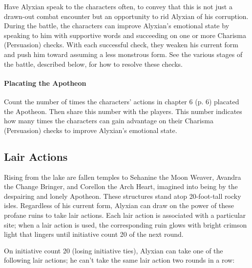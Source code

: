 \documentclass[letterpaper, 11pt, bg=full, twocolumn]{dndbook}
\begin{document}
Have Alyxian speak to the characters often, to convey that this is not just a drawn-out combat encounter but an opportunity to rid Alyxian of his corruption. During the battle, the characters can improve Alyxian's emotional state by speaking to him with supportive words and succeeding on one or more Charisma (Persuasion) checks. With each successful check, they weaken his current form and push him toward assuming a less monstrous form. See the various stages of the battle, described below, for how to resolve these checks.

\paragraph{Placating the Apotheon}

Count the number of times the characters' actions in chapter 6 (p. 6) placated the Apotheon. Then share this number with the players. This number indicates how many times the characters can gain advantage on their Charisma (Persuasion) checks to improve Alyxian's emotional state.


\subsection{Lair Actions}

Rising from the lake are fallen temples to Sehanine the Moon Weaver, Avandra the Change Bringer, and Corellon the Arch Heart, imagined into being by the despairing and lonely Apotheon. These structures stand atop 20-foot-tall rocky isles. Regardless of his current form, Alyxian can draw on the power of these profane ruins to take lair actions. Each lair action is associated with a particular site; when a lair action is used, the corresponding ruin glows with bright crimson light that lingers until initiative count 20 of the next round.

On initiative count 20 (losing initiative ties), Alyxian can take one of the following lair actions; he can't take the same lair action two rounds in a row:
\end{document}
